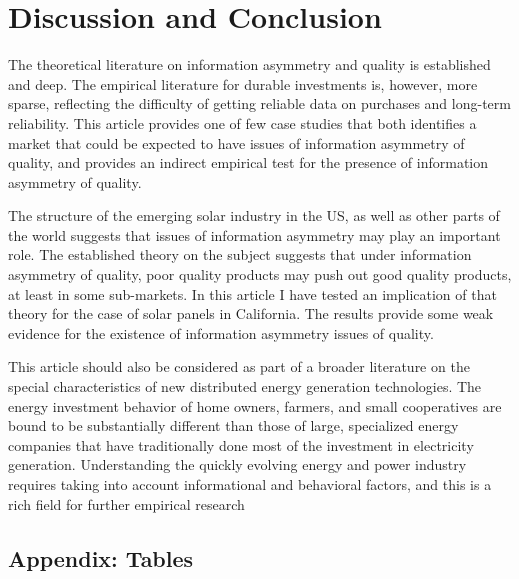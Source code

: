 \documentclass[12pt]{article}
\begin{document}
\section{Discussion and Conclusion}
The theoretical literature on information asymmetry and quality is established and deep. The empirical literature for durable investments is, however, more sparse, reflecting the difficulty of getting reliable data on purchases and long-term reliability. This article provides one of few case studies that both identifies a market that could be expected to have issues of information asymmetry of quality, and provides an indirect empirical test for the presence of information asymmetry of quality.

The structure of the emerging solar industry in the US, as well as other parts of the world suggests that issues of information asymmetry may play an important role. The established theory on the subject suggests that under information asymmetry of quality, poor quality products may push out good quality products, at least in some sub-markets. In this article I have tested an implication of that theory for the case of solar panels in California. The results provide some weak evidence for the existence of information asymmetry issues of quality.

This article should also be considered as part of a broader literature on the special characteristics of new distributed energy generation technologies. The energy investment behavior of home owners, farmers, and small cooperatives are bound to be substantially different than those of large, specialized energy companies that have traditionally done most of the investment in electricity generation. Understanding the quickly evolving energy and power industry requires taking into account informational and behavioral factors, and this is a rich field for further empirical research

\begin{spacing}{1}



\FloatBarrier

\appendix
\section{Appendix: Tables}


\end{spacing}
\end{document}
